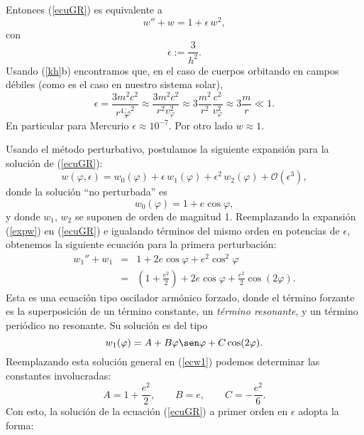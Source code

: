 Entonces (\ref{ecuGR})  es equivalente a
\begin{equation}
w''+w=1+\epsilon\,w^2 ,\label{ecwGR}
\end{equation}
con
\begin{equation}
 \epsilon:=\frac{3}{h^2}.
\end{equation}
Usando (\ref{kh}b) encontramos que, en el caso de cuerpos orbitando en campos
débiles (como es el caso en nuestro sistema solar),
\begin{equation}
 \epsilon=\frac{3m^2c^2}{r^4\dot\varphi^2}\approx\frac{3m^2c^2}{r^2v_\varphi^2}
 \approx 3\frac{m^2}{r^2}\frac{c^2}{v_\varphi^2}\approx 3\frac{m}{r}\ll 1.
\end{equation}
En particular para Mercurio $\epsilon\approx 10^{-7}$. Por otro lado $w\approx
1$.

Usando el método perturbativo, postulamos la siguiente expansión para la solución de (\ref{ecuGR}):
\begin{equation}
w(\varphi,\epsilon)=w_0(\varphi)+\epsilon\, w_1(\varphi) +\epsilon^2\,w_2(\varphi)+\mathcal{O}(\epsilon^3), \label{expw}
\end{equation}
donde la solución ``no perturbada'' es
\begin{equation}
 w_0(\varphi)=1+e\cos\varphi ,
\end{equation}
y donde $w_1$, $w_2$ se suponen de orden de magnitud 1. Reemplazando la expansión (\ref{expw}) en (\ref{ecuGR}) e igualando términos del mismo orden en potencias de $\epsilon$, obtenemos la siguiente ecuación para la primera perturbación:
\begin{eqnarray}
 w_1''+w_1&=&1+2e\cos\varphi+e^2\cos^2\varphi \\
&=& (1+\frac{e^2}{2})+2e\cos\varphi+\frac{e^2}{2}\cos(2\varphi). \label{ecw1}
\end{eqnarray}
Esta es una ecuación tipo oscilador armónico forzado, donde el término forzante es la superposición de un término constante, un \textit{término resonante}, y un término periódico no resonante. Su solución es del tipo
\begin{equation}
 w_1(\varphi)=A+B\varphi\sen\varphi+C\cos(2\varphi).
\end{equation}
Reemplazando esta solución general en (\ref{ecw1}) podemos determinar las constantes involucradas:
\begin{equation}
 A=1+\frac{e^2}{2}, \qquad B=e, \qquad C=-\frac{e^2}{6}.
\end{equation}
Con esto, la solución de la ecuación (\ref{ecuGR}) a primer orden en $\epsilon$ adopta la forma:
